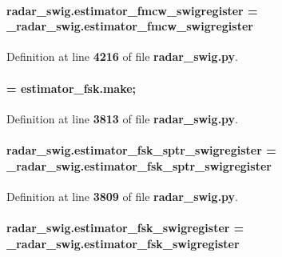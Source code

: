 \paragraph[{estimator\+\_\+fmcw\+\_\+swigregister}]{\setlength{\rightskip}{0pt plus 5cm}radar\+\_\+swig.\+estimator\+\_\+fmcw\+\_\+swigregister = \+\_\+radar\+\_\+swig.\+estimator\+\_\+fmcw\+\_\+swigregister}\label{namespaceradar__swig_a087b2f8ed832585b592616fe2f518193}


Definition at line {\bf 4216} of file {\bf radar\+\_\+swig.\+py}.

\paragraph[{estimator\+\_\+fsk}]{ = {\bf estimator\+\_\+fsk.\+make};}\label{namespaceradar__swig_aa4ba2f8443698b1896c1d18fa22fe25d}


Definition at line {\bf 3813} of file {\bf radar\+\_\+swig.\+py}.

\paragraph[{estimator\+\_\+fsk\+\_\+sptr\+\_\+swigregister}]{\setlength{\rightskip}{0pt plus 5cm}radar\+\_\+swig.\+estimator\+\_\+fsk\+\_\+sptr\+\_\+swigregister = \+\_\+radar\+\_\+swig.\+estimator\+\_\+fsk\+\_\+sptr\+\_\+swigregister}\label{namespaceradar__swig_aab65aac1b49a299fb7f9f0c5adef90f7}


Definition at line {\bf 3809} of file {\bf radar\+\_\+swig.\+py}.

\paragraph[{estimator\+\_\+fsk\+\_\+swigregister}]{\setlength{\rightskip}{0pt plus 5cm}radar\+\_\+swig.\+estimator\+\_\+fsk\+\_\+swigregister = \+\_\+radar\+\_\+swig.\+estimator\+\_\+fsk\+\_\+swigregister}\label{namespaceradar__swig_a77246cf6c678610c1cbf635a2154e446}


